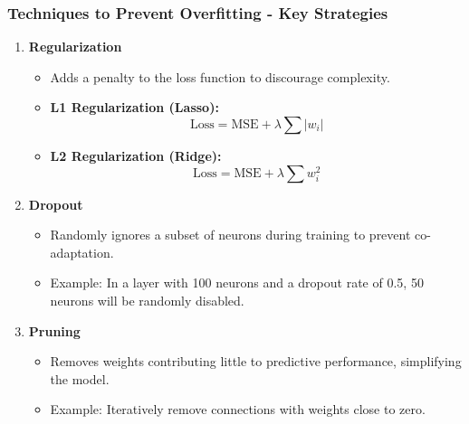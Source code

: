\documentclass[aspectratio=169]{beamer}
\begin{document}
\begin{frame}[fragile]
    \frametitle{Techniques to Prevent Overfitting - Key Strategies}
    \begin{enumerate}
        \item \textbf{Regularization}
        \begin{itemize}
            \item Adds a penalty to the loss function to discourage complexity.
            \item \textbf{L1 Regularization (Lasso):} 
                \begin{equation}
                \text{Loss} = \text{MSE} + \lambda \sum |w_i|
                \end{equation}
            \item \textbf{L2 Regularization (Ridge):}
                \begin{equation}
                \text{Loss} = \text{MSE} + \lambda \sum w_i^2
                \end{equation}
        \end{itemize}
        \item \textbf{Dropout}
        \begin{itemize}
            \item Randomly ignores a subset of neurons during training to prevent co-adaptation.
            \item Example: In a layer with 100 neurons and a dropout rate of 0.5, 50 neurons will be randomly disabled.
        \end{itemize}
        \item \textbf{Pruning}
        \begin{itemize}
            \item Removes weights contributing little to predictive performance, simplifying the model.
            \item Example: Iteratively remove connections with weights close to zero.
        \end{itemize}
    \end{enumerate}
\end{frame}
\end{document}
